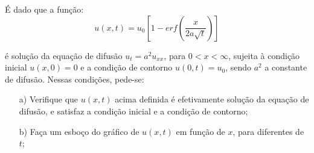 \linespread{1.5}

É dado que a função:
\begin{equation*}
    u(x,t) = u_0\left[1-erf\left(\frac{x}{2a\sqrt{t}}\right)\right]
\end{equation*}

é solução da equação de difusão $u_t = a^2u_{xx}$, para $0<x<\infty$, sujeita à condição inicial $u(x,0) = 0$ e a condição de contorno $u(0, t) = u_0$, sendo $a^2$ a constante de difusão. Nessas condições, pede-se:
\begin{itemize}
    \item[a)] Verifique que $u(x,t)$ acima definida é efetivamente solução da equação de difusão, e satisfaz a condição inicial e a condição de contorno;
    \item[b)] Faça um esboço do gráfico de $u(x,t)$ em função de $x$, para diferentes de $t$;
\end{itemize}